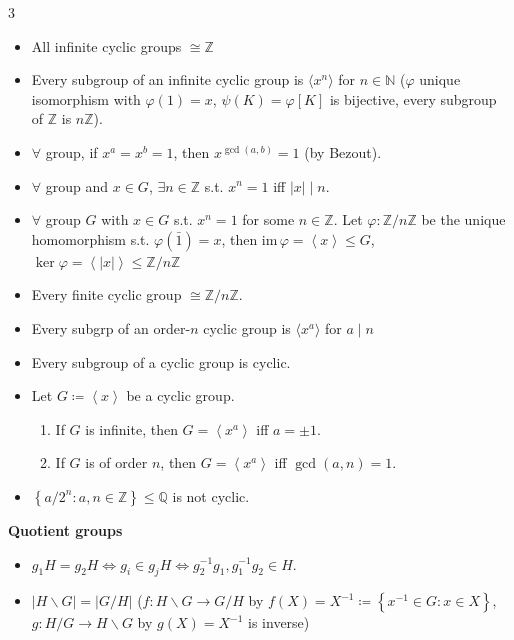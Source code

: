 \documentclass[10pt]{article}
\newcommand{\N}{\mathbb{N}} %
\newcommand{\Q}{\mathbb{Q}} %
\newcommand{\Z}{\mathbb{Z}} %
\newcommand{\abs}[1]{\left\lvert#1\right\rvert} %
\begin{document}
\begin{multicols*}{3}
\begin{itemize}
            \item All infinite cyclic groups $\cong \Z$
            \item Every subgroup of an infinite cyclic group is $\langle x^n \rangle$ for $n \in \N$ ($\varphi$ unique isomorphism with $\varphi\left(1\right) = x$, $\psi\left(K\right) = \varphi\left[K\right]$ is bijective, every subgroup of $\Z$ is $n\Z$).
            \item $\forall$ group, if $x^a = x^b = 1$, then $x^{\gcd\left(a, b\right)} = 1$ (by Bezout). 
            \item $\forall$ group and $x \in G$, $\exists n \in \Z$ s.t. $x^n = 1$ iff $\abs{x} \mid n$.
            \item $\forall$ group $G$ with $x \in G$ s.t. $x^n = 1$ for some $n \in \Z$. Let $\varphi \colon \Z \slash n\Z$ be the unique homomorphism s.t. $\varphi\left(\bar{1}\right) = x$, then $\mathrm{im}\,{\varphi} = \left\langle x \right\rangle \leq G$, $\ker{\varphi} = \left\langle\abs{x}\right\rangle \leq \Z \slash n\Z$ 
            \item Every finite cyclic group $\cong \Z \slash n\Z$.
            \item Every subgrp of an order-$n$ cyclic group is $\langle x^a \rangle$ for $a \mid n$
            \item Every subgroup of a cyclic group is cyclic.
            \item Let $G \coloneqq \left\langle x \right\rangle$ be a cyclic group.
            \begin{enumerate}
                \item If $G$ is infinite, then $G = \left\langle x^a \right\rangle$ iff $a = \pm 1$.
                \item If $G$ is of order $n$, then $G = \left\langle x^a \right\rangle$ iff $\gcd\left(a, n\right) = 1$.
            \end{enumerate}
            \item $\left\{a / 2^n \colon a, n \in \Z\right\} \leq \Q$ is not cyclic.
        \end{itemize}
        \textbf{Quotient groups}
        \begin{itemize}
            \setlength\itemsep{2pt}
            \item $g_1H = g_2H \iff g_i \in g_jH \iff g_2^{-1}g_1, g_1^{-1}g_2 \in H$.
            \item $\abs{H \backslash G} = \abs{G \slash H}$ ($f \colon H \backslash G \to G \slash H$ by $f\left(X\right) = X^{-1} \coloneqq \left\{x^{-1} \in G \colon x \in X\right\}$, $g \colon H \slash G \to H \backslash G$ by $g\left(X\right) = X^{-1}$ is inverse)

\end{itemize}
\end{multicols*}
\end{document}

